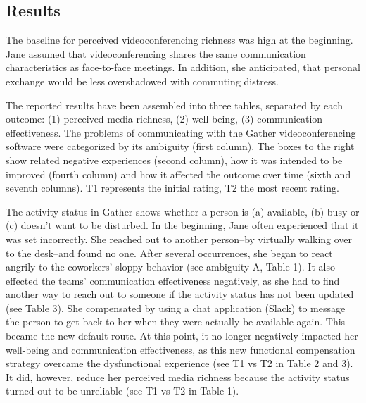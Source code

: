 \documentclass[man]{apa7}
\begin{document}
\subsection{Results}

The baseline for perceived videoconferencing richness was high at the beginning. Jane assumed that videoconferencing shares the same communication characteristics as face-to-face meetings. In addition, she anticipated, that personal exchange would be less overshadowed with commuting distress.

The reported results have been assembled into three tables, separated by each outcome: (1) perceived media richness, (2) well-being, (3) communication effectiveness. The problems of communicating with the Gather videoconferencing software were categorized by its ambiguity (first column). The boxes to the right show related negative experiences (second column), how it was intended to be improved (fourth column) and how it affected the outcome over time (sixth and seventh columns). T1 represents the initial rating, T2 the most recent rating.

The activity status in Gather shows whether a person is (a) available, (b) busy or (c) doesn't want to be disturbed. In the beginning, Jane often experienced that it was set incorrectly. She reached out to another person–by virtually walking over to the desk–and found no one. After several occurrences, she began to react angrily to the coworkers' sloppy behavior (see ambiguity A, Table 1). It also effected the teams' communication effectiveness negatively, as she had to find another way to reach out to someone if the activity status has not been updated (see Table 3). She compensated by using a chat application (Slack) to message the person to get back to her when they were actually be available again. This became the new default route. At this point, it no longer negatively impacted her well-being and communication effectiveness, as this new functional compensation strategy overcame the dysfunctional experience (see T1 vs T2 in Table 2 and 3). It did, however, reduce her perceived media richness because the activity status turned out to be unreliable (see T1 vs T2 in Table 1). 
\end{document}
